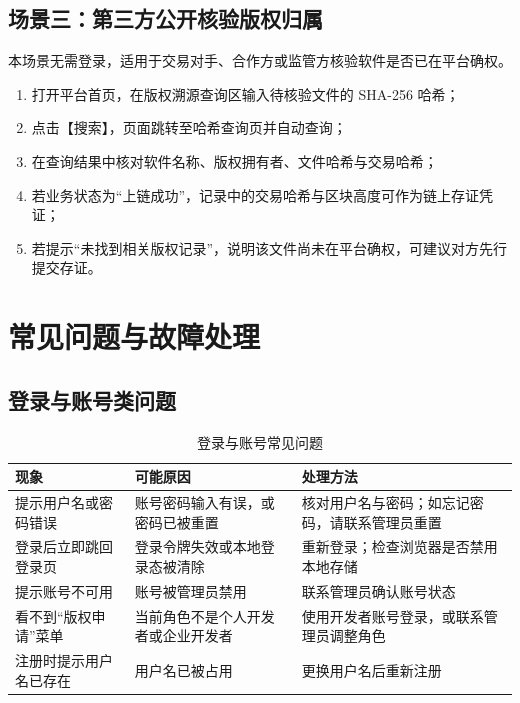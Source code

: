 \documentclass[UTF8,a4paper,12pt]{ctexart}
\begin{document}
\subsection{场景三：第三方公开核验版权归属}
\indent 本场景无需登录，适用于交易对手、合作方或监管方核验软件是否已在平台确权。\par

\begin{enumerate}
  \item 打开平台首页，在版权溯源查询区输入待核验文件的 SHA-256 哈希；
  \item 点击【搜索】，页面跳转至哈希查询页并自动查询；
  \item 在查询结果中核对软件名称、版权拥有者、文件哈希与交易哈希；
  \item 若业务状态为“上链成功”，记录中的交易哈希与区块高度可作为链上存证凭证；
  \item 若提示“未找到相关版权记录”，说明该文件尚未在平台确权，可建议对方先行提交存证。
\end{enumerate}

\section{常见问题与故障处理}

\subsection{登录与账号类问题}
\begin{table}[H]
  \centering
  \caption{登录与账号常见问题}
  \begin{tabularx}{0.96\textwidth}{p{} p{} Y}
    \toprule
    现象 & 可能原因 & 处理方法 \\
    \midrule
    提示用户名或密码错误 & 账号密码输入有误，或密码已被重置 & 核对用户名与密码；如忘记密码，请联系管理员重置 \\
    登录后立即跳回登录页 & 登录令牌失效或本地登录态被清除 & 重新登录；检查浏览器是否禁用本地存储 \\
    提示账号不可用 & 账号被管理员禁用 & 联系管理员确认账号状态 \\
    看不到“版权申请”菜单 & 当前角色不是个人开发者或企业开发者 & 使用开发者账号登录，或联系管理员调整角色 \\
    注册时提示用户名已存在 & 用户名已被占用 & 更换用户名后重新注册 \\
    \bottomrule
  \end{tabularx}
\end{table}
\end{document}
